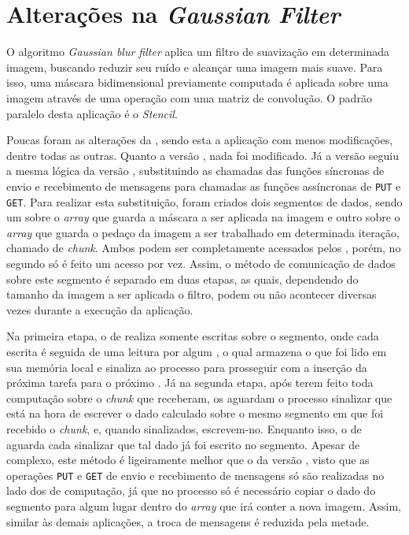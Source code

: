 \section{Alterações na \textit{Gaussian Filter}}
\label{sec:alteracoesgf}

O algoritmo \textit{Gaussian blur filter} aplica um filtro de suavização em determinada imagem, buscando reduzir seu ruído e alcançar uma imagem mais suave. Para isso, uma máscara bidimensional previamente computada é aplicada sobre uma imagem através de uma operação com uma matriz de convolução. O padrão paralelo desta aplicação é o \textit{Stencil}.

Poucas foram as alterações da \textit{\GF}, sendo esta a aplicação com menos modificações, dentre todas as outras. Quanto a versão \IPC, nada foi modificado. Já a versão \ASYNC seguiu a mesma lógica da versão \IPC, substituindo as chamadas das funções síncronas de envio e recebimento de mensagens para chamadas as funções assíncronas de \texttt{PUT} e \texttt{GET}. Para realizar esta substituição, foram criados dois segmentos de dados, sendo um sobre o \textit{array} que guarda a máscara a ser aplicada na imagem e outro sobre o \textit{array} que guarda o pedaço da imagem a ser trabalhado em determinada iteração, chamado de \textit{chunk}. Ambos podem ser completamente acessados pelos \slaves, porém, no segundo só é feito um acesso por vez. Assim, o método de comunicação de dados sobre este segmento é separado em duas etapas, as quais, dependendo do tamanho da imagem a ser aplicada o filtro, podem ou não acontecer diversas vezes durante a execução da aplicação. 

Na primeira etapa, o \cluster de \IO realiza somente escritas sobre o segmento, onde cada escrita é seguida de uma leitura por algum \CC, o qual armazena o que foi lido em sua memória local e sinaliza ao processo \master para prosseguir com a inserção da próxima tarefa para o próximo \CC. Já na segunda etapa, após terem feito toda computação sobre o \textit{chunk} que receberam, os \CCs aguardam o processo \master sinalizar que está na hora de escrever o dado calculado sobre o mesmo segmento em que foi recebido o \textit{chunk}, e, quando sinalizados, escrevem-no. Enquanto isso, o \cluster de \IO aguarda cada \CC sinalizar que tal dado já foi escrito no segmento. Apesar de complexo, este método é ligeiramente melhor que o da versão \IPC, visto que as operações \texttt{PUT} e \texttt{GET} de envio e recebimento de mensagens só são realizadas no lado dos \clusters de computação, já que no processo \master só é necessário copiar o dado do segmento para algum lugar dentro do \textit{array} que irá conter a nova imagem. Assim, similar às demais aplicações, a troca de mensagens é reduzida pela metade.


